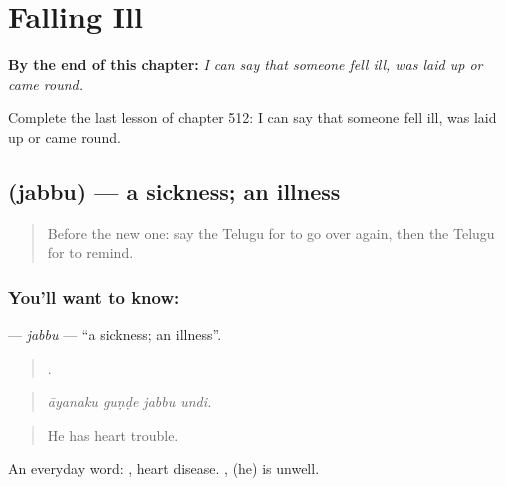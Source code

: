 
\chapter{Falling Ill}
\label{ch:te-falling-ill}

\begin{chapteropening}
\textbf{By the end of this chapter:} \emph{I can say that someone fell ill, was laid up or came round.}

Complete the last lesson of chapter 512: I can say that someone fell ill, was laid up or came round.
\end{chapteropening}

\section[\texorpdfstring{\te{జబ్బు} (jabbu)}{జబ్బు (jabbu)}]{ (jabbu) — a sickness; an illness}

\label{lesson:TE-C512-jabbu}



\begin{quote}
Before the new one: say the Telugu for to go over again, then the Telugu for to remind.
\end{quote}

\subsection*{You'll want to know: }
\textbf{} — \emph{jabbu} — \textquotedblleft{}a sickness; an illness\textquotedblright{}.

\begin{quote}
   .
\end{quote}

\begin{quote}
\emph{āyanaku guṇḍe jabbu undi.}
\end{quote}

\begin{quote}
He has heart trouble.
\end{quote}

An everyday word:  , heart disease.  , (he) is unwell.

